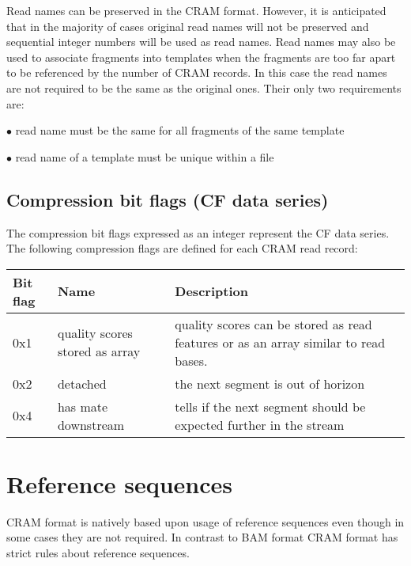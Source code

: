 \documentclass[a4paper]{article}
\begin{document}
Read names can be preserved in the CRAM format. However, it is anticipated that 
in the majority of cases original read names will not be preserved and sequential 
integer numbers will be used as read names. Read names may also be used to associate 
fragments into templates when the fragments are too far apart to be referenced 
by the number of CRAM records. In this case the read names are not required to 
be the same as the original ones. Their only two requirements are:

$\bullet$ read name must be the same for all fragments of the same template

$\bullet$ read name of a template must be unique within a file

\subsection{\textbf{Compression bit flags (CF data series)}}

The compression bit flags expressed as an integer represent the CF data series. 
The following compression flags are defined for each CRAM read record:

\begin{tabular}{|>{\raggedright}p{39pt}|>{\raggedright}p{150pt}|>{\raggedright}p{242pt}|}
\hline
\textbf{Bit flag} & \textbf{Name} & \textbf{Description}\tabularnewline
\hline
0x1 & quality scores stored as array & quality scores can be stored as read features 
or as an array similar to read bases.\tabularnewline
\hline
0x2 & detached & the next segment is out of horizon\tabularnewline
\hline
0x4 & has mate downstream & tells if the next segment should be expected further 
in the stream\tabularnewline
\hline
\end{tabular}

\section{\textbf{Reference sequences}}

CRAM format is natively based upon usage of reference sequences even though in 
some cases they are not required. In contrast to BAM format CRAM format has strict 
rules about reference sequences. 
\end{document}
